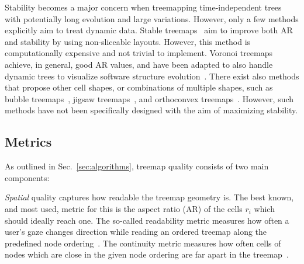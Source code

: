 Stability becomes a major concern when treemapping time-independent trees with potentially long evolution and large variations. However, only a few methods explicitly aim to treat dynamic data. Stable treemaps~\cite{sondag17} aim to improve both AR and stability by using non-sliceable layouts. However, this method is computationally expensive and not trivial to implement. Voronoi treemaps~\cite{balzer05,balzer05b}
achieve, in general, good AR values, and have been adapted to also handle dynamic trees to visualize software structure evolution~\cite{hees17,gotz11}. There exist also methods that propose other cell shapes, or combinations of multiple shapes, such as bubble treemaps~\cite{bubble}, jigsaw treemaps~\cite{jigsaw}, and orthoconvex treemaps~\cite{deberg14}. However, such methods have not been specifically designed with the aim of maximizing stability.


\subsection{Metrics}
\label{sec:metrics-3}
%
As outlined in Sec.~\ref{sec:algorithms}, treemap quality consists of two main components:

\emph{Spatial} quality captures how readable the treemap geometry is. The best known, and most used, metric for this is the aspect ratio (AR) of the cells $r_i$ which should ideally reach one. The so-called readability metric measures how often a user's gaze changes direction while reading an ordered treemap along the predefined node ordering~\cite{bederson02}. The continuity metric measures how often cells of nodes which are close in the given node ordering are far apart in the treemap~\cite{spiral}. %

